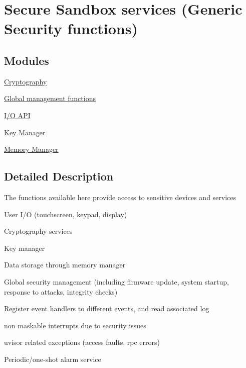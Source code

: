 \hypertarget{group__ssbx}{}\section{Secure Sandbox services (Generic Security functions)}
\label{group__ssbx}
\subsection*{Modules}
\begin{DoxyCompactItemize}
\item
\hyperlink{group__ssbx___crypto}{Cryptography}
\item
\hyperlink{group__ssbx___main}{Global management functions}
\item
\hyperlink{group__ssbx___i_o}{I/\+O A\+PI}
\item
\hyperlink{group__ssbx___key_management}{Key Manager}
\item
\hyperlink{group__ssbx___mem}{Memory Manager}
\end{DoxyCompactItemize}


\subsection{Detailed Description}
The functions available here provide access to sensitive devices and services
\begin{DoxyItemize}
\item User I/O (touchscreen, keypad, display)
\item Cryptography services
\item Key manager
\item Data storage through memory manager
\item Global security management (including firmware update, system startup, response to attacks, integrity checks)
\item Register event handlers to different events, and read associated log
\begin{DoxyItemize}
\item non maskable interrupts due to security issues
\item uvisor related exceptions (access faults, rpc errors)
\end{DoxyItemize}
\item Periodic/one-\/shot alarm service
\end{DoxyItemize}

